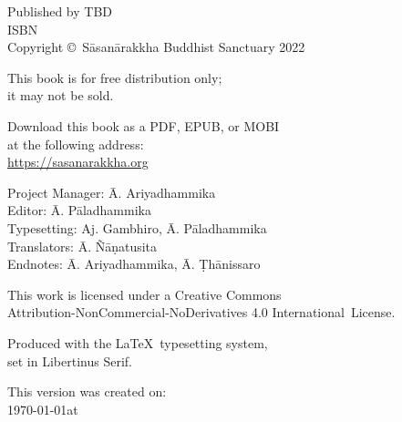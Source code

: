 \cleartoverso
\thispagestyle{empty}

\vspace*{-\baselineskip}

{%

\fontsize{10}{16}\selectfont
\centering
\setlength{\parindent}{0pt}%

\vspace{0.5cm}

Published by TBD\\
ISBN \theISBN\\
Copyright \copyright\ Sāsanārakkha Buddhist Sanctuary 2022

\vspace{0.5cm}

This book is for free distribution only;\\
it may not be sold.

\vspace{0.5cm}

Download this book as a PDF, EPUB, or MOBI\\
at the following address:\\
\href{https://sasanarakkha.org/}{https://sasanarakkha.org}

\vspace{0.5cm}

Project Manager: Ā. Ariyadhammika\\
Editor: Ā. Pāladhammika\\
Typesetting: Aj. Gambhiro, Ā. Pāladhammika\\
Translators: Ā. Ñāṇatusita\\
Endnotes: Ā. Ariyadhammika, Ā. Ṭhānissaro

\vspace{0.5cm}

This work is licensed under a Creative Commons\\
Attribution-NonCommercial-NoDerivatives 4.0 International~License.

Produced with the \LaTeX\ typesetting system,\\
set in Libertinus Serif.

\vspace{0.5cm}

\ifdesktopversion
This version was created on:\\
\today \space at \currenttime
\fi

\vspace{0.5cm}


\theEditionInfo

}
